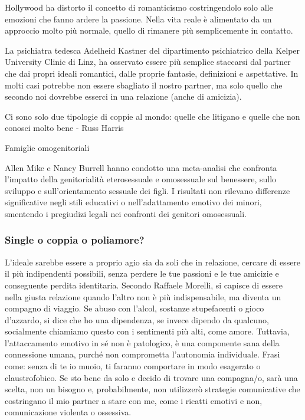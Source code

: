 \documentclass[12pt]{book} %
\begin{document}
Hollywood ha distorto il concetto di romanticismo costringendolo solo alle emozioni che fanno ardere la passione. Nella
vita reale è alimentato da un approccio molto più normale, quello di rimanere più semplicemente in contatto. 

La psichiatra tedesca Adelheid Kastner del dipartimento psichiatrico della Kelper University Clinic di Linz,
ha osservato essere più semplice staccarsi dal partner che dai propri ideali romantici, dalle proprie fantasie, definizioni
e aspettative. In molti casi potrebbe non essere sbagliato il nostro partner, ma solo quello che secondo noi dovrebbe
esserci in una relazione (anche di amicizia). 

Ci sono solo due tipologie di coppie al mondo: quelle che litigano e quelle che non conosci molto bene - Russ Harris

\begin{mdframed}[linewidth=1pt]
Famiglie omogenitoriali

Allen Mike e Nancy Burrell hanno condotto una meta-analisi che confronta l'impatto della genitorialità eterosessuale e omosessuale sul benessere, sullo sviluppo e sull'orientamento sessuale dei figli. I risultati non rilevano differenze significative negli stili educativi o nell'adattamento emotivo dei minori, smentendo i pregiudizi legali nei confronti dei genitori omosessuali.
\end{mdframed}

\subsubsection{Single o coppia o poliamore?}

L'ideale sarebbe essere a proprio agio sia da soli che in relazione, cercare di essere il più indipendenti possibili, senza perdere le tue passioni e le tue amicizie e conseguente perdita identitaria. 
Secondo Raffaele Morelli, si capisce di essere nella giusta relazione quando l'altro non è più indispensabile, ma diventa un compagno di viaggio. Se abuso con l'alcol, sostanze stupefacenti o gioco d'azzardo, si dice che ho una dipendenza, se invece dipendo da qualcuno, socialmente chiamiamo questo con i sentimenti più alti, come amore.
Tuttavia, l’attaccamento emotivo in sé non è patologico, è una componente sana della connessione umana, purché non comprometta l’autonomia individuale.
Frasi come: senza di te io muoio, ti faranno comportare in modo esagerato o claustrofobico. Se sto bene da solo e decido di trovare una compagna/o, sarà una scelta, non un bisogno e, probabilmente, non utilizzerò strategie comunicative che costringano il mio partner a stare con me, come i ricatti emotivi e non, comunicazione violenta o ossessiva.
\end{document}
